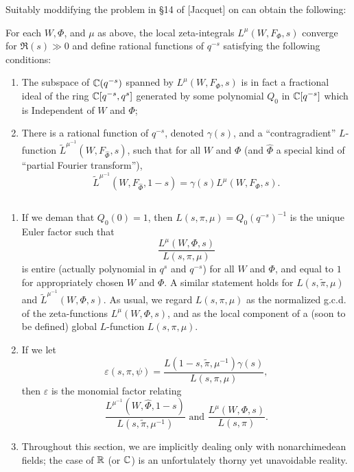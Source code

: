 Suitably moddifying the problem in \S 14 of [Jacquet] on can obtain the following:
\begin{proposition}
    For each $W, \Phi$, and $\mu$ as above, the local zeta-integrals $L^\mu(W, F_\Phi, s)$ converge for $\Re(s) \gg 0$ and define rational functions of $q^{-s}$ satisfying the following conditions:
    \begin{enumerate}[label=(\roman*)]
        \item The subspace of $\mathbb{C}(q^{-s})$ spanned by $L^\mu(W, F_\Phi, s)$ is in fact a fractional ideal of the ring $\mathbb{C}[q^{-s}, q^s]$ generated by some polynomial $Q_0$ in $\mathbb{C}[q^{-s}]$ which is Independent of $W$ and $\Phi$;
        \item There is a rational function of $q^{-s}$, denoted $\gamma(s)$, and a ``contragradient'' $L$-function $\tilde{L}^{\mu^{-1}}(W, F_{\widehat{\Phi}}, s)$, such that for all $W$ and $\Phi$ (and $\widehat{\Phi}$ a special kind of ``partial Fourier transform''),
        \[
            \tilde{L}^{\mu^{-1}}(W, F_{\widehat{\Phi}}, 1 -s) = \gamma(s) L^\mu(W, F_{\Phi}, s).
        \]
    \end{enumerate}
\end{proposition}

\subsection{}
\label{sec:4.3}


\begin{remark*}
\begin{enumerate}[label=(\roman*)]
    \item If we deman that $Q_0(0) = 1$, then $L(s, \pi, \mu) = Q_0(q^{-s})^{-1}$ is the unique Euler factor such that
    \[
        \frac{L^\mu(W, \Phi, s)}{L(s, \pi, \mu)}
    \]
    is entire (actually polynomial in $q^s$ and $q^{-s}$) for all $W$ and $\Phi$, and equal to $1$ for appropriately chosen $W$ and $\Phi$.
    A similar statement holds for $L(s, \tilde{\pi}, \mu)$ and $\tilde{L}^{\mu^{-1}}(W, \Phi, s)$.
    As usual, we regard $L(s, \pi, \mu)$ as the normalized g.c.d. of the zeta-functions $L^\mu(W, \Phi, s)$, and as the local component of a (soon to be defined) global $L$-function $L(s, \pi, \mu)$.
    \item If we let
    \[
        \varepsilon(s, \pi, \psi) = \frac{L(1 - s, \tilde{\pi}, \mu^{-1})\gamma(s)}{L(s, \pi, \mu)},
    \]
    then $\varepsilon$ is the monomial factor relating
    \[
        \frac{L^{\mu^{-1}}(W, \widehat{\Phi}, 1 - s)}{L(s, \tilde{\pi}, \mu^{-1})} \text{ and } \frac{L^\mu(W, \Phi, s)}{L(s, \pi)}.
    \]
    \item Throughout this section, we are implicitly dealing only with nonarchimedean fields; the case of $\mathbb{R}$ (or $\mathbb{C}$) is an unfortulately thorny yet unavoidable reality.
\end{enumerate} 
\end{remark*}


